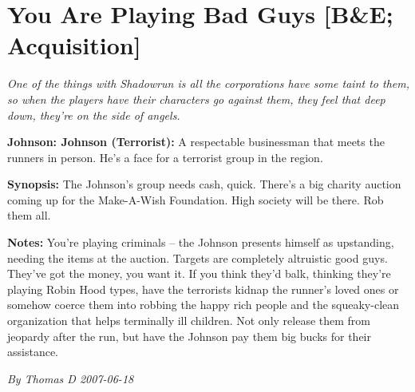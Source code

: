 \documentclass[letterpaper,twocolumn,10.5pt]{article}
\newenvironment{scenario}[6]
	{
		\section{#1 {\small[#2]}}
		\textit{#3}
		\def\TMPSCENARIO{#4 #5}
	}
	{\small\textit{By \TMPSCENARIO}}
\newcommand{\johnson}[2]{\textbf{Johnson: #1 (#2):}}
\newcommand{\synopsis}{\textbf{Synopsis: }}
\newcommand{\notes}{\textbf{Notes: }}
\begin{document}
\begin{scenario}{You Are Playing Bad Guys}
	{B\&E; Acquisition}
	{ One of the things with Shadowrun is all the corporations have some taint to them, so when the players have their characters go against them, they feel that deep down, they're on the side of angels.}
	{Thomas D}
	{2007-06-18}
	{https://forum.rpg.net/showthread.php?321504-Shadowrun-4th-101-Instant-Scenarios\&p=7440245#post7440245}

\johnson{Johnson}{Terrorist} A respectable businessman that meets the runners in person. He's a face for a terrorist group in the region.

\synopsis The Johnson's group needs cash, quick. There's a big charity auction coming up for the Make-A-Wish Foundation. High society will be there. Rob them all.

\notes You're playing criminals -- the Johnson presents himself as upstanding, needing the items at the auction. Targets are completely altruistic good guys. They've got the money, you want it. If you think they'd balk, thinking they're playing Robin Hood types, have the terrorists kidnap the runner's loved ones or somehow coerce them into robbing the happy rich people and the squeaky-clean organization that helps terminally ill children. Not only release them from jeopardy after the run, but have the Johnson pay them big bucks for their assistance. 

\end{scenario}
\end{document}
